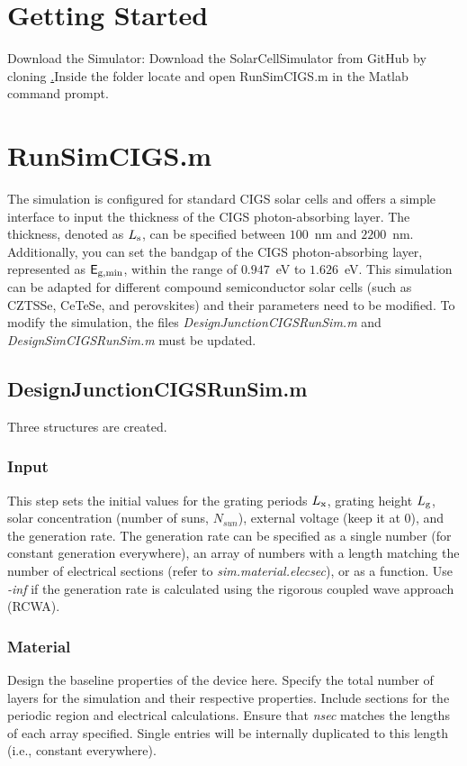 \documentclass[10pt]{article}
\def\Lg{L_{\rm g}}
\def\Ls{L_{\rm s}}
\def\Lx{L_{\rm x}}
\def\sfE{{\sf E}}
\def\ego{\sfE_{\rm g,min}}
\def\Nsun{N_{sun}}
\def\Lg{L_{\rm g}}
\def\Ls{L_{\rm s}}
\def\Lx{L_{\rm x}}
\def\sfE{{\sf E}}
\def\ego{\sfE_{\rm g,min}}
\begin{document}
\section{Getting Started}
Download the Simulator: Download the SolarCellSimulator
from GitHub by cloning \href{https://github.com/nibj/SolarCellSimulator.git} .Inside the folder locate and
open RunSimCIGS.m in the Matlab command prompt.


\section{RunSimCIGS.m}
The simulation is configured for standard CIGS solar cells and offers a simple interface to input the thickness of the CIGS photon-absorbing layer. The thickness, denoted as $\Ls$, can be specified between $100$~nm and $2200$~nm. Additionally, you can set the bandgap of the CIGS photon-absorbing layer, represented as $\ego$, within the range of $0.947$~eV to $1.626$~eV. This simulation can be adapted for different compound semiconductor solar cells (such as CZTSSe, CeTeSe, and perovskites) and their parameters need to be modified. To modify the simulation, the files \emph{DesignJunctionCIGSRunSim.m} and \emph{DesignSimCIGSRunSim.m} must be updated.

\subsection{DesignJunctionCIGSRunSim.m}
Three structures are created. 

\subsubsection{Input}
This step sets the initial values for the grating periods $\Lx$, grating height $\Lg$, solar concentration (number of suns, $\Nsun$), external voltage (keep it at 0), and the generation rate. The generation rate can be specified as a single number (for constant generation everywhere), an array of numbers with a length matching the number of electrical sections (refer to \emph{sim.material.elecsec}), or as a function. Use \emph{-inf} if the generation rate is calculated using the rigorous coupled wave approach (RCWA).
  

\subsubsection{Material}
Design the baseline properties of the device here. Specify the total number of layers for the simulation and their respective properties. Include sections for the periodic region and electrical calculations. Ensure that \emph{nsec} matches the lengths of each array specified. Single entries will be internally duplicated to this length (i.e., constant everywhere).
\end{document}
